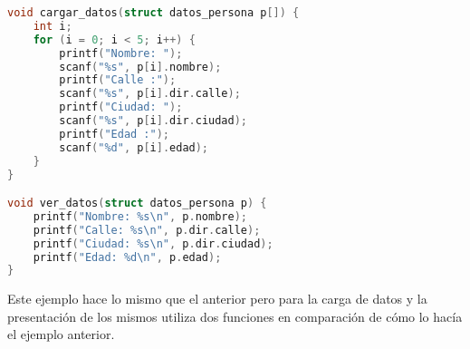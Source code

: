 {\begin{Ejemplo}
\begin{lstlisting}[language=C]
void cargar_datos(struct datos_persona p[]) {
    int i;
    for (i = 0; i < 5; i++) {
        printf("Nombre: ");
        scanf("%s", p[i].nombre);
        printf("Calle :");
        scanf("%s", p[i].dir.calle);
        printf("Ciudad: ");
        scanf("%s", p[i].dir.ciudad);
        printf("Edad :");
        scanf("%d", p[i].edad);
    }
}

void ver_datos(struct datos_persona p) {
    printf("Nombre: %s\n", p.nombre);
    printf("Calle: %s\n", p.dir.calle);
    printf("Ciudad: %s\n", p.dir.ciudad);
    printf("Edad: %d\n", p.edad);
}

\end{lstlisting}
\Explicacion
Este ejemplo hace lo mismo que el anterior pero para la carga de datos y la presentación de los mismos utiliza dos funciones en comparación de cómo lo hacía el ejemplo anterior.
\end{Ejemplo}
}
